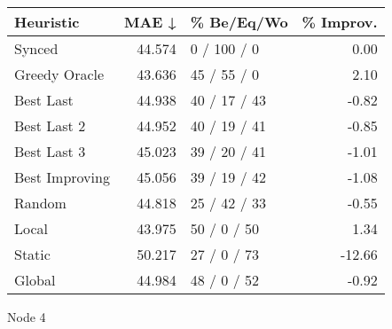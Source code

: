 \begin{tabular}{lrlr}
\toprule
\textbf{Heuristic} & \textbf{MAE ↓} & \textbf{\% Be/Eq/Wo} & \textbf{\% Improv.} \\
\midrule
            Synced &         44.574 &          0 / 100 / 0 &                0.00 \\
     Greedy Oracle &         43.636 &          45 / 55 / 0 &                2.10 \\
         Best Last &         44.938 &         40 / 17 / 43 &               -0.82 \\
       Best Last 2 &         44.952 &         40 / 19 / 41 &               -0.85 \\
       Best Last 3 &         45.023 &         39 / 20 / 41 &               -1.01 \\
    Best Improving &         45.056 &         39 / 19 / 42 &               -1.08 \\
            Random &         44.818 &         25 / 42 / 33 &               -0.55 \\
             Local &         43.975 &          50 / 0 / 50 &                1.34 \\
            Static &         50.217 &          27 / 0 / 73 &              -12.66 \\
            Global &         44.984 &          48 / 0 / 52 &               -0.92 \\
\bottomrule
\end{tabular}
\caption{Node 4}
\label{tab:non_lr05_le1_bs2_4}
